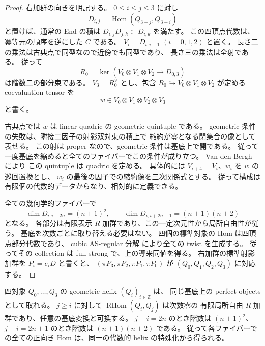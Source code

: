 \begin{proof}
右加群の向きを明記する。
$0\le i\le j\le3$ に対し
\[
 D_{i,j}=\operatorname{Hom}(Q_{3-j},Q_{3-i})
\]
と置けば、通常の End の積は $D_{i,j}D_{j,k}\subset D_{i,k}$ を満たす。
この四頂点代数は、冪等元の順序を逆にした $C$ である。
$V_i=D_{i,i+1}$ $(i=0,1,2)$ と置く。
長さ二の乗法は古典点で同型なので近傍でも同型であり、
長さ三の乗法は全射である。
従って
\[
 R_0=\ker(V_0\otimes V_1\otimes V_2\longrightarrow D_{0,3})
\]
は階数二の部分束である。
$V_3=R_0^\vee$ とし、包含 $R_0\hookrightarrow V_0\otimes V_1\otimes V_2$
が定める coevaluation tensor を
\[
 w\in V_0\otimes V_1\otimes V_2\otimes V_3
\]
と書く。

古典点では $w$ は linear quadric の geometric quintuple である。
geometric 条件の失敗は、隣接二因子の射影双対束の積上で
縮約が零となる閉集合の像として表せる。
この射は proper なので、geometric 条件は基底上で開である。
従って一度基底を縮めると全てのファイバーでこの条件が成り立つ。
Van den Bergh \cite[定理5.2.2、系5.2.3、定理5.5.10]{VdBQuadrics} により
この quintuple は quadric を定める。
具体的には $V_{i+4}=V_i$、$w_i$ を $w$ の巡回置換とし、
$w_i$ の最後の因子での縮約像を三次関係式とする。
従って構成は有限個の代数的データからなり、相対的に定義できる。

全ての幾何学的ファイバーで
\[
 \dim D_{i,i+2n}=(n+1)^2,\qquad
 \dim D_{i,i+2n+1}=(n+1)(n+2)
\]
となる。
各部分は有限表示 $R$-加群であり、この一定次元性から局所自由性が従う。
基底を次数ごとに取り替える必要はない。
四個の標準対象の Hom は四頂点部分代数であり、
cubic AS-regular 分解 \cite[定理5.5.7]{VdBQuadrics} により全ての twist を生成する。
従ってその collection は full strong で、上の導来同値を得る。
右加群の標準射影加群を $P_i=e_iD$ と書くと、
$(\pi P_3,\pi P_2,\pi P_1,\pi P_0)$ が $(Q_0,Q_1,Q_2,Q_3)$ に対応する。
\end{proof}

\begin{lemma}\label{lem:relative-helix-basechange}
四対象 $Q_0,\ldots,Q_3$ の geometric helix $(Q_i)_{i\in\mathbb Z}$ は、
同じ基底上の perfect objects として取れる。
$j\ge i$ に対して $\operatorname{RHom}(Q_i,Q_j)$ は次数零の
有限局所自由 $R$-加群であり、任意の基底変換と可換する。
$j-i=2n$ のとき階数は $(n+1)^2$、$j-i=2n+1$ のとき階数は
$(n+1)(n+2)$ である。
従って各ファイバーでの全ての正向き Hom は、同一の代数的 helix の特殊化から得られる。
\end{lemma}

